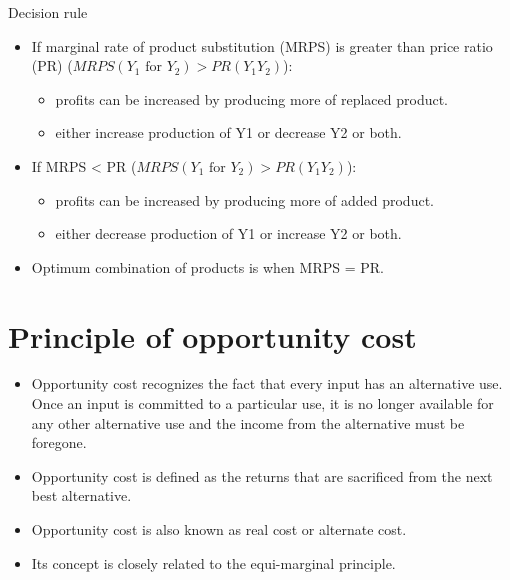 \documentclass[12pt,ignorenonframetext,aspectratio=169]{beamer}
\providecommand{\tightlist}{%
  \setlength{\itemsep}{0pt}\setlength{\parskip}{0pt}}
\begin{document}
\begin{frame}{Decision rule}
\protect\hypertarget{decision-rule}{}
\begin{itemize}
\tightlist
\item
  If marginal rate of product substitution (MRPS) is greater than price
  ratio (PR) (\(MRPS (Y_1 \textrm{ for } Y_2) > PR (Y_1 Y_2)\)):

  \begin{itemize}
  \tightlist
  \item
    profits can be increased by producing more of replaced product.
  \item
    either increase production of Y1 or decrease Y2 or both.
  \end{itemize}
\item
  If MRPS \textless{} PR
  (\(MRPS (Y_1 \textrm{ for } Y_2) > PR (Y_1 Y_2)\)):

  \begin{itemize}
  \tightlist
  \item
    profits can be increased by producing more of added product.
  \item
    either decrease production of Y1 or increase Y2 or both.
  \end{itemize}
\item
  Optimum combination of products is when MRPS = PR.
\end{itemize}
\end{frame}

\hypertarget{principle-of-opportunity-cost}{%
\section{Principle of opportunity
cost}\label{principle-of-opportunity-cost}}

\begin{frame}{}
\protect\hypertarget{section-5}{}
\begin{itemize}
\tightlist
\item
  Opportunity cost recognizes the fact that every input has an
  alternative use. Once an input is committed to a particular use, it is
  no longer available for any other alternative use and the income from
  the alternative must be foregone.
\item
  Opportunity cost is defined as the returns that are sacrificed from
  the next best alternative.
\item
  Opportunity cost is also known as real cost or alternate cost.
\item
  Its concept is closely related to the equi-marginal principle.
\end{itemize}
\end{frame}
\end{document}
